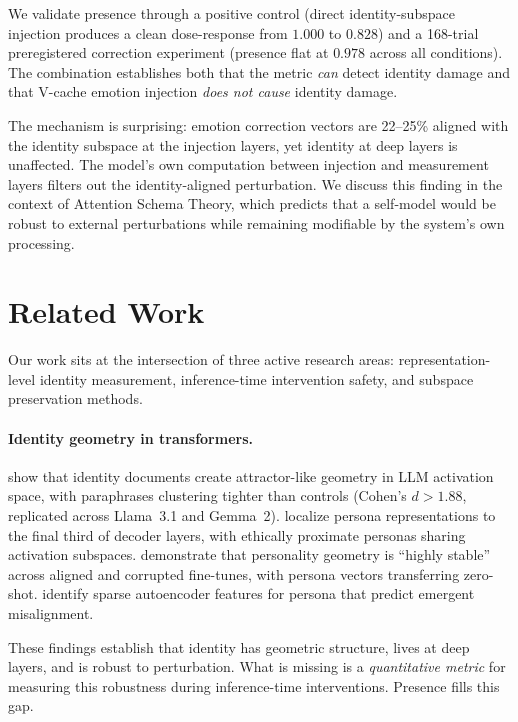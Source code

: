 \documentclass[11pt,a4paper]{article}
\begin{document}
We validate presence through a positive control (direct identity-subspace
injection produces a clean dose-response from $1.000$ to $0.828$) and a
168-trial preregistered correction experiment (presence flat at $0.978$
across all conditions). The combination establishes both that the metric
\emph{can} detect identity damage and that V-cache emotion injection
\emph{does not cause} identity damage.

The mechanism is surprising: emotion correction vectors are 22--25\%
aligned with the identity subspace at the injection layers, yet identity at
deep layers is unaffected. The model's own computation between injection
and measurement layers filters out the identity-aligned perturbation. We
discuss this finding in the context of Attention Schema Theory, which
predicts that a self-model would be robust to external perturbations while
remaining modifiable by the system's own processing.

\section{Related Work}
\label{sec:related}

Our work sits at the intersection of three active research areas:
representation-level identity measurement, inference-time intervention
safety, and subspace preservation methods.

\paragraph{Identity geometry in transformers.}
\citet{vasilenko2026identity} show that identity documents create
attractor-like geometry in LLM activation space, with paraphrases clustering
tighter than controls (Cohen's $d > 1.88$, replicated across Llama~3.1 and
Gemma~2). \citet{cintas2025localizing} localize persona representations to
the final third of decoder layers, with ethically proximate personas sharing
activation subspaces. \citet{aneja2026intrinsic} demonstrate that personality
geometry is ``highly stable'' across aligned and corrupted fine-tunes, with
persona vectors transferring zero-shot. \citet{wang2025persona} identify
sparse autoencoder features for persona that predict emergent misalignment.

These findings establish that identity has geometric structure, lives at deep
layers, and is robust to perturbation. What is missing is a
\emph{quantitative metric} for measuring this robustness during inference-time
interventions. Presence fills this gap.
\end{document}
